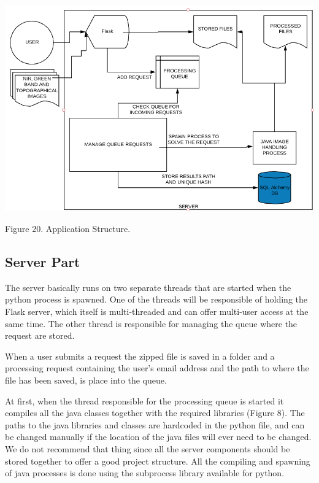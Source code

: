 \documentclass[12pt, a4paper]{report}
\begin{document}
\medskip
\includegraphics[scale=0.795, right]{application_overview.png}
\begin{center}
Figure 20. Application Structure.
\end{center}
\par 

\subsection{Server Part}

\quad 
The server basically runs on two separate threads that are started when the python process is spawned. One of the threads will be responsible of holding the Flask server, which itself is multi-threaded and can offer multi-user access at the same time. The other thread is responsible for managing the queue where the request are stored.
\par 

When a user submits a request the zipped file is saved in a folder and a processing request containing the user's email address and the path to where the file has been saved, is place into the queue. 
\par 

At first, when the thread responsible for the processing queue is started it compiles all the java classes together with the required libraries (Figure 8). The paths to the java libraries and classes are hardcoded in the python file, and can be changed manually if the location of the java files will ever need to be changed. We do not recommend that thing since all the server components should be stored together to offer a good project structure. All the compiling and spawning of java processes is done using the subprocess library available for python. 
\par 
\end{document}

